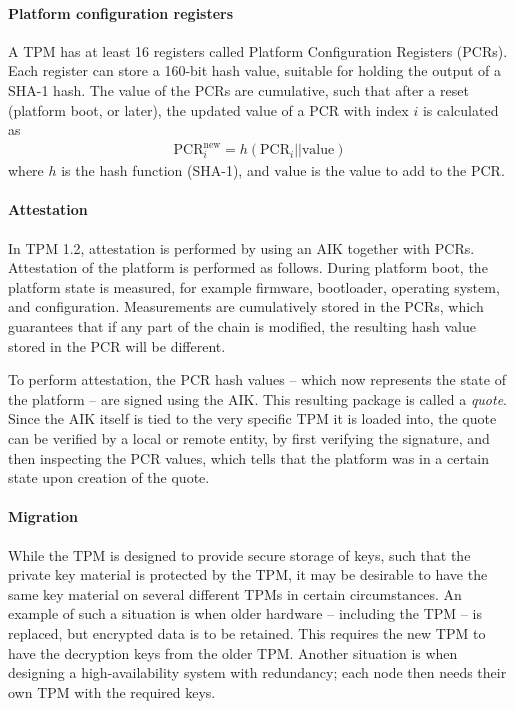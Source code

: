 \paragraph{Platform configuration registers}

A TPM has at least 16 registers called Platform Configuration Registers (PCRs).
Each register can store a 160-bit hash value, suitable for holding the output of a SHA-1 hash.
The value of the PCRs are cumulative, such that after a reset (platform boot, or later), the updated value of a PCR with index $i$ is calculated as
\begin{align}
	\text{PCR}_i^{\text{new}} = h(\text{PCR}_i || \text{value})     \label{eq:kappa-pcrextend}
\end{align}
where $h$ is the hash function (SHA-1), and $\text{value}$ is the value to add to the PCR.

\paragraph{Attestation}

In TPM 1.2, attestation is performed by using an AIK together with PCRs.
Attestation of the platform is performed as follows.
During platform boot, the platform state is measured, for example firmware, bootloader, operating system, and configuration.
Measurements are cumulatively stored in the PCRs, which guarantees that if any part of the chain is modified, the resulting hash value stored in the PCR will be different.

To perform attestation, the PCR hash values -- which now represents the state of the platform -- are signed using the AIK.
This resulting package is called a \emph{quote}.
Since the AIK itself is tied to the very specific TPM it is loaded into, the quote can be verified by a local or remote entity, by first verifying the signature, and then inspecting the PCR values, which tells that the platform was in a certain state upon creation of the quote.

\paragraph{Migration}

While the TPM is designed to provide secure storage of keys, such that the private key material is protected by the TPM, it may be desirable to have the same key material on several different TPMs in certain circumstances.
An example of such a situation is when older hardware -- including the TPM -- is replaced, but encrypted data is to be retained.
This requires the new TPM to have the decryption keys from the older TPM.
Another situation is when designing a high-availability system with redundancy; each node then needs their own TPM with the required keys.

